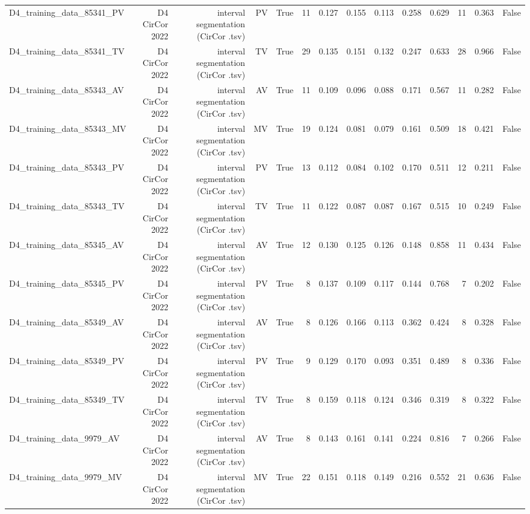 \begin{table}[htbp]
\begin{tabular}{lrrrrrrrrrrrrr}
    D4\_training\_data\_85341\_PV & D4 CirCor 2022 & interval segmentation (CirCor .tsv) & PV & True & 11 & 0.127 & 0.155 & 0.113 & 0.258 & 0.629 & 11 & 0.363 & False \\
    D4\_training\_data\_85341\_TV & D4 CirCor 2022 & interval segmentation (CirCor .tsv) & TV & True & 29 & 0.135 & 0.151 & 0.132 & 0.247 & 0.633 & 28 & 0.966 & False \\
    D4\_training\_data\_85343\_AV & D4 CirCor 2022 & interval segmentation (CirCor .tsv) & AV & True & 11 & 0.109 & 0.096 & 0.088 & 0.171 & 0.567 & 11 & 0.282 & False \\
    D4\_training\_data\_85343\_MV & D4 CirCor 2022 & interval segmentation (CirCor .tsv) & MV & True & 19 & 0.124 & 0.081 & 0.079 & 0.161 & 0.509 & 18 & 0.421 & False \\
    D4\_training\_data\_85343\_PV & D4 CirCor 2022 & interval segmentation (CirCor .tsv) & PV & True & 13 & 0.112 & 0.084 & 0.102 & 0.170 & 0.511 & 12 & 0.211 & False \\
    D4\_training\_data\_85343\_TV & D4 CirCor 2022 & interval segmentation (CirCor .tsv) & TV & True & 11 & 0.122 & 0.087 & 0.087 & 0.167 & 0.515 & 10 & 0.249 & False \\
    D4\_training\_data\_85345\_AV & D4 CirCor 2022 & interval segmentation (CirCor .tsv) & AV & True & 12 & 0.130 & 0.125 & 0.126 & 0.148 & 0.858 & 11 & 0.434 & False \\
    D4\_training\_data\_85345\_PV & D4 CirCor 2022 & interval segmentation (CirCor .tsv) & PV & True & 8 & 0.137 & 0.109 & 0.117 & 0.144 & 0.768 & 7 & 0.202 & False \\
    D4\_training\_data\_85349\_AV & D4 CirCor 2022 & interval segmentation (CirCor .tsv) & AV & True & 8 & 0.126 & 0.166 & 0.113 & 0.362 & 0.424 & 8 & 0.328 & False \\
    D4\_training\_data\_85349\_PV & D4 CirCor 2022 & interval segmentation (CirCor .tsv) & PV & True & 9 & 0.129 & 0.170 & 0.093 & 0.351 & 0.489 & 8 & 0.336 & False \\
    D4\_training\_data\_85349\_TV & D4 CirCor 2022 & interval segmentation (CirCor .tsv) & TV & True & 8 & 0.159 & 0.118 & 0.124 & 0.346 & 0.319 & 8 & 0.322 & False \\
    D4\_training\_data\_9979\_AV & D4 CirCor 2022 & interval segmentation (CirCor .tsv) & AV & True & 8 & 0.143 & 0.161 & 0.141 & 0.224 & 0.816 & 7 & 0.266 & False \\
    D4\_training\_data\_9979\_MV & D4 CirCor 2022 & interval segmentation (CirCor .tsv) & MV & True & 22 & 0.151 & 0.118 & 0.149 & 0.216 & 0.552 & 21 & 0.636 & False \\

\end{tabular}
\end{table}
